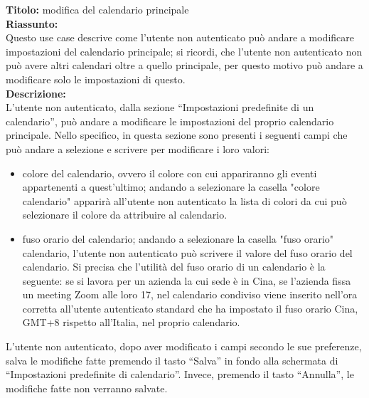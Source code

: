 \begin{listaPersonale}[UC]{}
    \begin{listaPersonale2}[UC] {}
        \textbf{Titolo: } modifica del calendario principale \\
        \textbf{Riassunto:} \\
        Questo use case descrive come l'utente non autenticato può andare a modificare impostazioni del calendario principale; si ricordi, che l'utente non autenticato non può avere altri calendari oltre a quello principale, per questo motivo può andare a modificare solo le impostazioni di questo. \\
        \textbf{Descrizione:} \\
        L'utente non autenticato, dalla sezione  “Impostazioni predefinite di un calendario”, può andare a modificare le impostazioni del proprio calendario principale. Nello specifico, in questa sezione sono presenti i seguenti campi che può andare a selezione e scrivere per modificare i loro valori:
                \begin{itemize}
                    \item colore del calendario, ovvero il colore con cui appariranno gli eventi appartenenti a quest'ultimo; andando a selezionare la casella "colore calendario" apparirà all'utente non autenticato la lista di colori da cui può selezionare il colore da attribuire al calendario.
                    \item fuso orario del calendario; andando a selezionare la casella "fuso orario" calendario, l'utente non autenticato può scrivere il valore del fuso orario del calendario. Si precisa che l'utilità del fuso orario di un calendario è la seguente:  se si lavora per un azienda la cui sede è in Cina, se l'azienda fissa un meeting Zoom alle loro 17, nel calendario condiviso viene inserito nell'ora corretta all'utente autenticato standard che ha impostato il fuso orario Cina, GMT+8 rispetto all'Italia, nel proprio calendario.
                \end{itemize}
        L'utente non autenticato, dopo aver modificato i campi secondo le sue preferenze, salva le modifiche fatte premendo il tasto “Salva” in fondo alla schermata di “Impostazioni predefinite di calendario”. Invece, premendo il tasto “Annulla”, le modifiche fatte non verranno salvate.
        

\end{listaPersonale2}
\end{listaPersonale}
